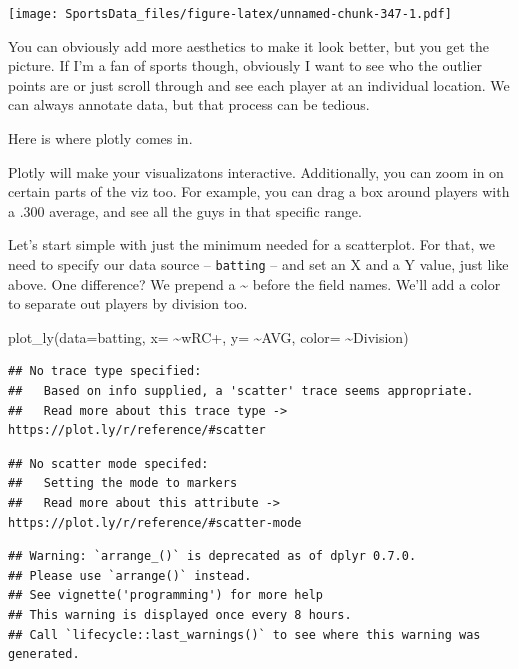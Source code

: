 \documentclass[
]{book}
\newenvironment{Shaded}{\begin{snugshade}}{\end{snugshade}}
\newcommand{\AttributeTok}[1]{\textcolor[rgb]{0.77,0.63,0.00}{#1}}
\newcommand{\FunctionTok}[1]{\textcolor[rgb]{0.00,0.00,0.00}{#1}}
\newcommand{\NormalTok}[1]{#1}
\newcommand{\SpecialCharTok}[1]{\textcolor[rgb]{0.00,0.00,0.00}{#1}}
\newcommand{\StringTok}[1]{\textcolor[rgb]{0.31,0.60,0.02}{#1}}
\begin{document}
\texttt{[image: SportsData\_files/figure-latex/unnamed-chunk-347-1.pdf]}

You can obviously add more aesthetics to make it look better, but you get the picture. If I'm a fan of sports though, obviously I want to see who the outlier points are or just scroll through and see each player at an individual location. We can always annotate data, but that process can be tedious.

Here is where plotly comes in.

Plotly will make your visualizatons interactive. Additionally, you can zoom in on certain parts of the viz too. For example, you can drag a box around players with a .300 average, and see all the guys in that specific range.

Let's start simple with just the minimum needed for a scatterplot. For that, we need to specify our data source -- \texttt{batting} -- and set an X and a Y value, just like above. One difference? We prepend a \textasciitilde{} before the field names. We'll add a color to separate out players by division too.

\begin{Shaded}
\begin{Highlighting}[]
\FunctionTok{plot\_ly}\NormalTok{(}\AttributeTok{data=}\NormalTok{batting, }\AttributeTok{x=} \SpecialCharTok{\textasciitilde{}}\StringTok{\textasciigrave{}}\AttributeTok{wRC+}\StringTok{\textasciigrave{}}\NormalTok{, }\AttributeTok{y=} \SpecialCharTok{\textasciitilde{}}\NormalTok{AVG, }\AttributeTok{color=} \SpecialCharTok{\textasciitilde{}}\NormalTok{Division)}
\end{Highlighting}
\end{Shaded}

\begin{verbatim}
## No trace type specified:
##   Based on info supplied, a 'scatter' trace seems appropriate.
##   Read more about this trace type -> https://plot.ly/r/reference/#scatter
\end{verbatim}

\begin{verbatim}
## No scatter mode specifed:
##   Setting the mode to markers
##   Read more about this attribute -> https://plot.ly/r/reference/#scatter-mode
\end{verbatim}

\begin{verbatim}
## Warning: `arrange_()` is deprecated as of dplyr 0.7.0.
## Please use `arrange()` instead.
## See vignette('programming') for more help
## This warning is displayed once every 8 hours.
## Call `lifecycle::last_warnings()` to see where this warning was generated.
\end{verbatim}
\end{document}
